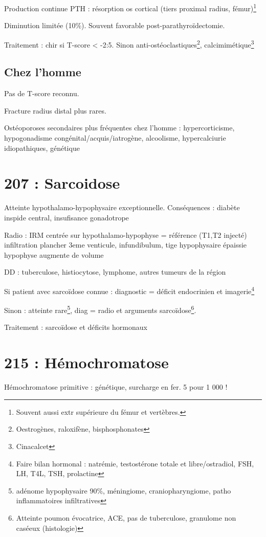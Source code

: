 \documentclass[11pt]{article}
\begin{document}
Production continue PTH : \inc résorption os cortical (tiers proximal radius,
fémur)\footnote{Souvent aussi extr supérieure du fémur et vertèbres.}

Diminution limitée (10\%). Souvent favorable post-parathyroïdectomie.

Traitement : chir si T-score < -2:5. Sinon anti-ostéoclastiques\footnote{Oestrogènes, raloxifène, bisphosphonates}, calcimimétique\footnote{Cinacalcet}

\subsection{Chez l'homme}
\label{sec:org42582f3}
Pas de T-score reconnu. 

Fracture radius distal plus rares.

Ostéoporoses secondaires plus fréquentes chez l'homme : hypercorticisme,
hypogonadisme congénital/acquis/iatrogène, alcoolisme, hypercalciurie
idiopathiques, génétique
\section{207 : Sarcoidose}
\label{sec:orgb2cf75d}
Atteinte hypothalamo-hypophysaire exceptionnelle. Conséquences : diabète
inspide central, insufisance gonadotrope

Radio : IRM centrée sur hypothalamo-hypophyse = référence (T1,T2 injecté) \thus
infiltration plancher 3eme venticule, infundibulum, tige hypophysaire épaissie
\textpm{} hypophyse augmente de volume

DD : tuberculose, histiocytose, lymphome, autres tumeurs de la région 

Si patient avec sarcoïdose connue : diagnostic = déficit endocrinien et imagerie\footnote{Faire bilan hormonal : natrémie, testostérone totale et libre/ostradiol,
FSH, LH, T4L, TSH, prolactine}

Sinon : atteinte rare\footnote{adénome hypophysaire 90\%, méningiome, craniopharyngiome, patho
inflammatoires infiltratives}, diag = radio et arguments sarcoïdose\footnote{Atteinte poumon évocatrice, \inc{} ACE, pas de tuberculose, granulome
non caséeux (histologie)}.

Traitement : sarcoïdose et déficits hormonaux

\section{215 : Hémochromatose}
\label{sec:org9eea311}
Hémochromatose primitive : génétique, surcharge en fer. 5 pour 1 000 !
\end{document}
